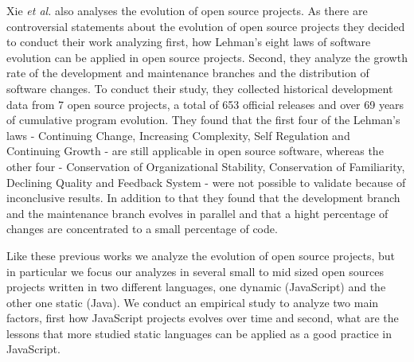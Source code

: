 Xie \emph{et al.} \cite{Xie2009ICSM} also analyses the evolution of open source projects. As there are controversial statements about the evolution of open source projects they decided to conduct their work analyzing first, how Lehman's eight laws of software evolution \cite{Lehman1997METRICS} can be applied in open source projects. Second, they analyze the growth rate of the development and maintenance branches and the distribution of software changes. To conduct their study, they collected historical development data from 7 open source projects, a total of 653 official releases and over 69 years of cumulative program evolution. They found that the first four of the Lehman's laws - Continuing Change, Increasing Complexity, Self Regulation and Continuing Growth - are still applicable in open source software, whereas the other four - Conservation of Organizational Stability, Conservation of Familiarity, Declining Quality and Feedback System - were not possible to validate because of inconclusive results. In addition to that they found that the development branch and the maintenance branch evolves in parallel and that a hight percentage of changes are concentrated to a small percentage of code.    

Like these previous works we analyze the evolution of open source projects, but in particular we focus our analyzes in several small to mid sized  open sources projects written in two different languages, one dynamic (JavaScript) and the other one static (Java). We conduct an empirical study to analyze two main factors, first how JavaScript projects evolves over time and second, what are the lessons that more studied static languages can be applied as a good practice in JavaScript.

